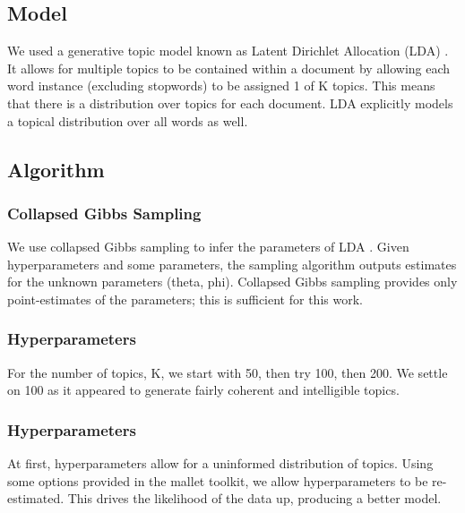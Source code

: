 \subsection {Model}
We used a generative topic model known as Latent Dirichlet Allocation (LDA) \cite{Blei:2003:LDA:944919.944937}. It allows for multiple topics to be contained within a document by allowing each word instance (excluding stopwords) to be assigned 1 of K topics. This means that there is a distribution over topics for each document. LDA explicitly models a topical distribution over all words as well. %


\subsection {Algorithm}

\subsubsection{Collapsed Gibbs Sampling}
We use collapsed Gibbs sampling to infer the parameters of LDA \cite{Blei:2003:LDA:944919.944937}. Given hyperparameters and some parameters, the sampling algorithm outputs estimates for the unknown parameters (theta, phi). Collapsed Gibbs sampling provides only point-estimates of the parameters; this is sufficient for this work. 

\subsubsection{Hyperparameters}
For the number of topics, K, we start with 50, then try 100, then 200. We settle on 100 as it appeared to generate fairly coherent and intelligible topics. %

\subsubsection{Hyperparameters}
At first, hyperparameters allow for a uninformed distribution of topics. Using some options provided in the mallet toolkit, we allow hyperparameters to be re-estimated. This drives the likelihood of the data up, producing a better model.

